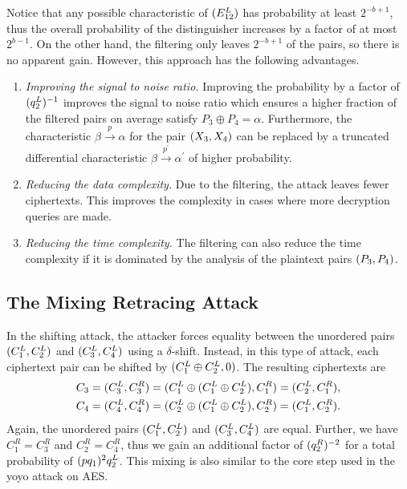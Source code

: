 \documentclass[twoside]{article}
\begin{document}
Notice that any possible characteristic of \((E_{12}^L)\) has probability
at least \(2^{-b + 1}\), thus the overall probability of the distinguisher
increases by a factor of at most \(2^{b - 1}\). On the other hand, the filtering
only leaves \(2^{-b + 1}\) of the pairs, so there is no apparent gain. However,
this approach has the following advantages.

\begin{enumerate}
    \item \emph{Improving the signal to noise ratio.} Improving the probability
    by a factor of \((q_2^L)^{-1}\) improves the signal to noise ratio
    which ensures a higher fraction of the filtered pairs on average satisfy
    \(P_3 \oplus P_4 = \alpha\). Furthermore, the characteristic \(\beta
    \xrightarrow{p} \alpha\) for the pair \((X_3, X_4)\) can be replaced by
    a truncated differential characteristic \(\beta \xrightarrow{p^\prime}
    \alpha^\prime\) of higher probability.
    \item \emph{Reducing the data complexity.} Due to the filtering, the attack
    leaves fewer ciphertexts. This improves the complexity in cases where more
    decryption queries are made.
    \item \emph{Reducing the time complexity.} The filtering can also reduce the
    time complexity if it is dominated by the analysis of the plaintext pairs
    \((P_3, P_4)\).
\end{enumerate}

\subsection{The Mixing Retracing Attack}

In the shifting attack, the attacker forces equality between the unordered pairs
\((C_1^L, C_2^L)\) and \((C_3^L, C_4^L)\) using a \(\delta\)-shift.
Instead, in this type of attack, each ciphertext pair can be shifted by
\((C_1^L \oplus C_2^L, 0)\). The resulting ciphertexts are
\begin{align}
    C_3 &= (C_3^L, C_3^R) = (C_1^L \oplus (C_1^L \oplus C_2^L), C_1^R) = (C_2^L, C_1^R), \\
    C_4 &= (C_4^L, C_4^R) = (C_2^L \oplus (C_1^L \oplus C_2^L), C_2^R) = (C_1^L, C_2^R).
\end{align}
Again, the unordered pairs \((C_1^L, C_2^L)\) and \((C_3^L, C_4^L)\)
are equal. Further, we have \(C_1^R = C_3^R\) and \(C_2^R = C_4^R\), thus we
gain an additional factor of \((q_2^R)^{-2}\) for a total probability of
\((pq_1)^2q_2^L\). This mixing is also similar to the core step used in the
yoyo attack on AES.
\end{document}
